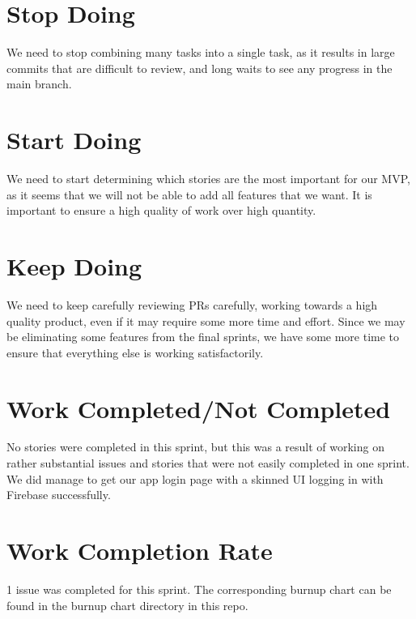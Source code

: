\documentclass[12pt,letterpaper]{article}
\begin{document}
	\section*{Stop Doing}
We need to stop combining many tasks into a single task, as it results in large commits that are difficult to review, and long waits to see any progress in the main branch.
	\section*{Start Doing}
We need to start determining which stories are the most important for our MVP, as it seems that we will not be able to add all features that we want. 
It is important to ensure a high quality of work over high quantity.
	\section*{Keep Doing}
We need to keep carefully reviewing PRs carefully, working towards a high quality product, even if it may require some more time and effort. Since we may be eliminating some features from the final sprints, we have some more time to ensure that everything else is working satisfactorily.
	\section*{Work Completed/Not Completed}
No stories were completed in this sprint, but this was a result of working on rather substantial issues and stories that were not easily completed in one sprint.
We did manage to get our app login page with a skinned UI logging in with Firebase successfully.
	\section*{Work Completion Rate}

1 issue was completed for this sprint. The corresponding burnup chart can be found in the burnup chart directory in this repo.
\end{document}
